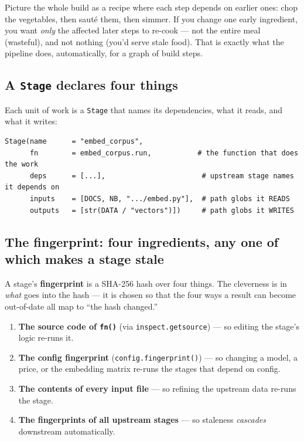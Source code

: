 \documentclass[11pt]{article}
\newcommand{\code}[1]{\texttt{#1}}
\begin{document}
Picture the whole build as a recipe where each step depends on earlier ones: chop the vegetables,
then sauté them, then simmer. If you change one early ingredient, you want \emph{only} the affected
later steps to re-cook --- not the entire meal (wasteful), and not nothing (you'd serve stale food).
That is exactly what the pipeline does, automatically, for a graph of build steps.

\subsection{A \texttt{Stage} declares four things}

Each unit of work is a \code{Stage} that names its dependencies, what it reads, and what it writes:

\begin{lstlisting}
Stage(name      = "embed_corpus",
      fn        = embed_corpus.run,           # the function that does the work
      deps      = [...],                       # upstream stage names it depends on
      inputs    = [DOCS, NB, ".../embed.py"],  # path globs it READS
      outputs   = [str(DATA / "vectors")])     # path globs it WRITES
\end{lstlisting}

\subsection{The fingerprint: four ingredients, any one of which makes a stage stale}

A stage's \textbf{fingerprint} is a SHA-256 hash over four things. The cleverness is in \emph{what}
goes into the hash --- it is chosen so that the four ways a result can become out-of-date all map to
``the hash changed.''

\begin{enumerate}[leftmargin=1.6em, itemsep=2pt]
  \item \textbf{The source code of \code{fn()}} (via \code{inspect.getsource}) --- so editing the
        stage's logic re-runs it.
  \item \textbf{The config fingerprint} (\code{config.fingerprint()}) --- so changing a model, a
        price, or the embedding matrix re-runs the stages that depend on config.
  \item \textbf{The contents of every input file} --- so refining the upstream data re-runs the stage.
  \item \textbf{The fingerprints of all upstream stages} --- so staleness \emph{cascades} downstream
        automatically.
\end{enumerate}
\end{document}
